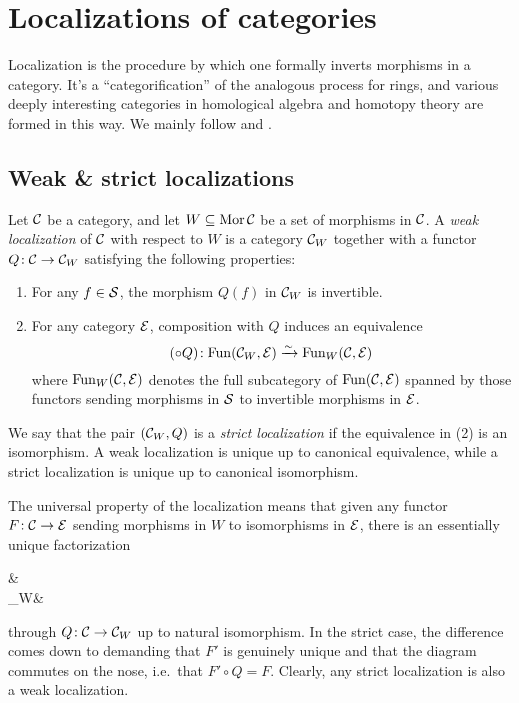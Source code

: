 
\section{Localizations of categories}\label{section:localization-of-categories}
Localization is the procedure by which one formally inverts morphisms in a category. It's a ``categorification'' of the analogous process for rings, and various deeply interesting
categories in homological algebra and homotopy theory are formed in this way. We mainly follow \cite{krause-homological-theory-of-representations} and \cite{kashiwara-schapira-book}.

\subsection{Weak \& strict localizations}
\begin{definition}
	Let \(\mathcal{C}\) be a category, and let \(W\subseteq\operatorname{Mor}\mathcal{C}\) be a set of morphisms in \(\mathcal{C}\). A \emph{weak localization} of \(\mathcal{C}\) with respect to \(W\)
	is a category \(\mathcal{C}_W\) together with a functor \(Q\!:\mathcal{C}\to\mathcal{C}_W\) satisfying the following properties:
	\begin{enumerate}[label=(\arabic*)]
	\item For any \(f\in\mathcal{S}\), the morphism \(Q(f)\) in \(\mathcal{C}_W\) is invertible.
	\item For any category \(\mathcal{E}\), composition with \(Q\) induces an equivalence
	\[ (\circ Q)\!:\operatorname{Fun}(\mathcal{C}_W,\mathcal{E}) \xrightarrow{\sim} \operatorname{Fun}_W(\mathcal{C},\mathcal{E}) \]
	where \(\operatorname{Fun}_W(\mathcal{C},\mathcal{E})\) denotes the full subcategory of \(\operatorname{Fun}(\mathcal{C},\mathcal{E})\) spanned by those functors sending morphisms in \(\mathcal{S}\) to invertible morphisms in \(\mathcal{E}\).
	\end{enumerate}
	We say that the pair \((\mathcal{C}_W,Q)\) is a \emph{strict localization} if the equivalence in (2) is an isomorphism. A weak localization is unique up to canonical equivalence, while
	a strict localization is unique up to canonical isomorphism.
\end{definition}
\begin{remark}\label{remark:1-categorical-property-of-localization}
	The universal property of the localization means that given any functor \(F\!:\mathcal{C}\to\mathcal{E}\) sending morphisms in \(W\) to isomorphisms in \(\mathcal{E}\), there is an essentially unique factorization
	\begin{diagram*}
		\calC\ar[d,"Q"']\ar[dr,"F",""{name=A,left}] & \\
		\calC_W\ar[r,dashed,"F'"'] & \calE\ar[from=l,to=A,symbol=\cong]
	\end{diagram*}
	through \(Q\!:\mathcal{C}\to\mathcal{C}_W\) up to natural isomorphism. In the strict case, the difference comes down to demanding that \(F'\) is genuinely unique and that the diagram commutes on the nose, i.e.\ that \(F'\circ Q = F\).
	Clearly, any strict localization is also a weak localization.
\end{remark}
